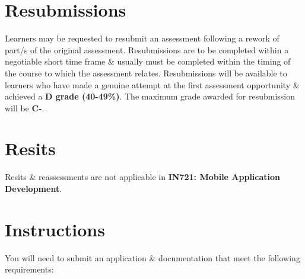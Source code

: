 \documentclass{article}
\begin{document}
\section*{Resubmissions}
Learners may be requested to resubmit an assessment following a rework of part/s of the original assessment. Resubmissions are to be completed within a negotiable short time frame \& usually must be completed within the timing of the course to which the assessment relates. Resubmissions will be available to learners who have made a genuine attempt at the first assessment opportunity \& achieved a \textbf{D grade (40-49\%)}. The maximum grade awarded for resubmission will be \textbf{C-}.

\section*{Resits}
Resits \& reassessments are not applicable in \textbf{IN721: Mobile Application Development}. 

\section*{Instructions}
You will need to submit an application \& documentation that meet the following requirements:
\end{document}
